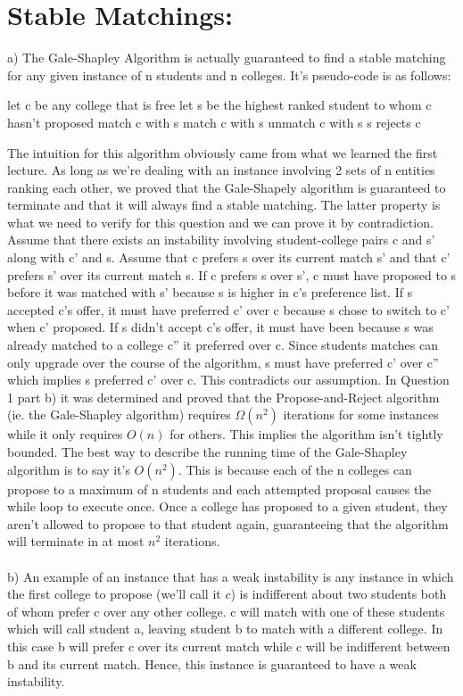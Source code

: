 \documentclass{article}
\begin{document}
\section{Stable Matchings:}
a) The Gale-Shapley Algorithm is actually guaranteed to find a stable matching for any given instance of n students and n colleges. It's pseudo-code is as follows:
\begin{algorithmic}
    \STATE let c be any college that is free
    \STATE let s be the highest ranked student to whom c hasn't proposed
            match c with s
        \ELSE
                \STATE match c with s 
                \STATE unmatch c with s
            \ELSE
                \STATE s rejects c
        \ENDIF
\ENDWHILE
\end{algorithmic}
The intuition for this algorithm obviously came from what we learned the first lecture. As long as we're dealing with an instance involving 2 sets of n entities ranking each other, we proved that the Gale-Shapely algorithm is guaranteed to terminate and that it will always find a stable matching. The latter property is what we need to verify for this question and we can prove it by contradiction. Assume that there exists an instability involving student-college pairs c and s' along with c' and s. Assume that c prefers s over its current match s' and that c' prefers s' over its current match s. If c prefers s over s', c must have proposed to s before it was matched with s' because s is higher in c's preference list. If s accepted c's offer, it must have preferred c' over c because s chose to switch to c' when c' proposed. If s didn't accept c's offer, it must have been because s was already matched to a college c'' it preferred over c. Since students matches can only upgrade over the course of the algorithm, s must have preferred c' over c'' which implies s preferred c' over c. This contradicts our assumption. In Question 1 part b) it was determined and proved that the Propose-and-Reject algorithm (ie. the Gale-Shapley algorithm) requires $\Omega(n^2)$ iterations for some instances while it only requires $O(n)$ for others. This implies the algorithm isn't tightly bounded. The best way to describe the running time of the Gale-Shapley algorithm is to say it's $O(n^2)$. This is because each of the n colleges can propose to a maximum of n students and each attempted proposal causes the while loop to execute once. Once a college has proposed to a given student, they aren't allowed to propose to that student again, guaranteeing that the algorithm will terminate in at most $n^2$ iterations.\\\\
b) An example of an instance that has a weak instability is any instance in which the first college to propose (we'll call it $c$) is indifferent about two students both of whom prefer c over any other college. c will match with one of these students which will call student a, leaving student b to match with a different college. In this case b will prefer c over its current match while c will be indifferent between b and its current match. Hence, this instance is guaranteed to have a weak instability. 
\end{document}
